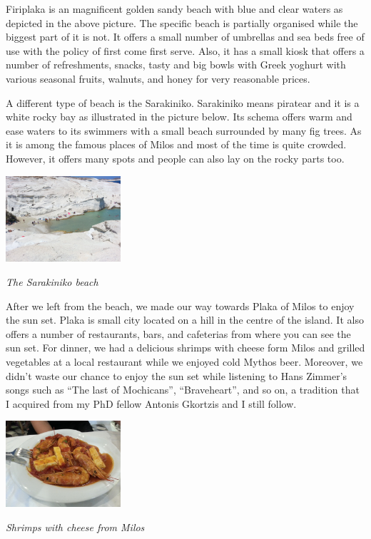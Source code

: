 \documentclass[10pt,a4paper]{article} %
\begin{document}
\begin{multicols}{3}
Firiplaka is an magnificent golden sandy beach with blue and clear waters 
as depicted in the above picture. 
The specific beach is partially organised while the biggest part of it is not. 
It offers a small number of umbrellas and sea beds free of use with the policy 
of first come first serve. 
Also, it has a small kiosk that offers a number of refreshments, snacks, tasty 
and big bowls with Greek yoghurt with various seasonal fruits, walnuts, and honey 
for very reasonable prices. 


A different type of beach is the Sarakiniko. 
Sarakiniko means piratear and it is a white rocky bay as illustrated in the 
picture below. 
Its schema offers warm and ease waters to its swimmers with a small beach surrounded 
by many fig trees. 
As it is among the famous places of Milos and most of the time is quite crowded. 
However, it offers many spots and people can also lay on the rocky parts too.


\begin{center}
	\includegraphics[width=0.32\textwidth]{media/milos_beach_2.jpg}
	\par\textit{The Sarakiniko beach}
\end{center} 


After we left from the beach, we made our way towards Plaka of Milos to enjoy the 
sun set. 
Plaka is small city located on a hill in the centre of the island. 
It also offers a number of restaurants, bars, and cafeterias from where you can 
see the sun set. 
For dinner, we had a delicious shrimps with cheese form Milos and grilled vegetables 
at a local restaurant while we enjoyed cold Mythos beer. 
Moreover, we didn't waste our chance to enjoy the sun set while listening to Hans 
Zimmer's songs such as ``The last of Mochicans'', ``Braveheart'', and so on, a 
tradition that I acquired from my PhD fellow Antonis Gkortzis and I still follow.


\begin{center}
	\includegraphics[width=0.32\textwidth]{media/milos_food.jpg}
	\par\textit{Shrimps with cheese from Milos}
\end{center}



\end{multicols}
\end{document}
